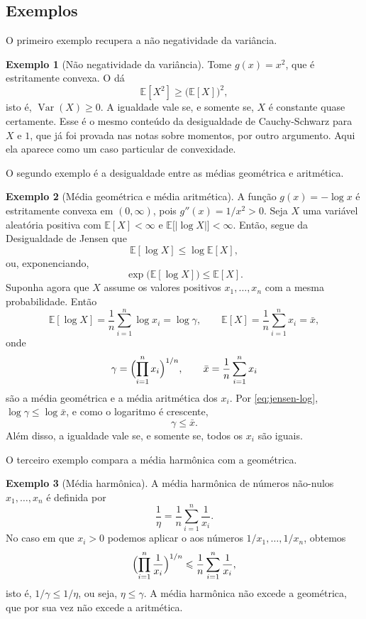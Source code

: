 \documentclass[12pt,portuguese]{article}
\theoremstyle{definition}
\newtheorem{example}[example]{Exemplo}
\theoremstyle{plainexercise}
\theoremstyle{starredexercise}
\theoremstyle{definition}
\begin{document}
\subsection{Exemplos}\label{subsec:jensen-exemplos}

O primeiro exemplo recupera a não negatividade da variância.

\begin{example}[Não negatividade da variância]\label{ex:jensen-quadrado}
Tome $g(x)=x^2$, que é estritamente convexa. O  dá
\[
\mathbb{E}[X^2]\geqslant\bigl(\mathbb{E}[X]\bigr)^2,
\]
isto é, $\operatorname{Var}(X)\geqslant0$. A igualdade vale se, e somente se,
$X$ é constante quase certamente. Esse é o mesmo conteúdo da desigualdade de
Cauchy-Schwarz para $X$ e $1$, que já foi provada nas notas sobre momentos, por outro
argumento. Aqui ela aparece como um caso particular de convexidade.
\end{example}

O segundo exemplo é a desigualdade entre as médias geométrica e aritmética.

\begin{example}[Média geométrica e média aritmética]\label{ex:media-geometrica}
A função $g(x)=-\log x$ é estritamente convexa em $(0,\infty)$, pois
$g''(x)=1/x^2>0$. Seja $X$ uma variável aleatória positiva com
$\mathbb{E}[X]<\infty$ e $\mathbb{E}\bigl[|\log X|\bigr]<\infty$. 
Então, segue da Desigualdade de Jensen que
\begin{equation}\label{eq:jensen-log}
\mathbb{E}[\log X]\leqslant\log\mathbb{E}[X],
\end{equation}
ou, exponenciando,
\[
\exp\bigl(\mathbb{E}[\log X]\bigr)\leqslant\mathbb{E}[X].
\]
Suponha agora que $X$ assume os valores positivos $x_1,\ldots,x_n$ com a mesma
probabilidade. Então
\[
\mathbb{E}[\log X]=\frac{1}{n}\sum_{i=1}^{n}\log x_i=\log\gamma,
\qquad
\mathbb{E}[X]=\frac{1}{n}\sum_{i=1}^{n}x_i=\bar{x},
\]
onde
\[
\gamma=\Bigl(\prod_{i=1}^{n}x_i\Bigr)^{1/n},
\qquad
\bar{x}=\frac{1}{n}\sum_{i=1}^{n}x_i
\]
são a média geométrica e a média aritmética dos $x_i$. Por \eqref{eq:jensen-log},
$\log\gamma\leqslant\log\bar{x}$, e como o logaritmo é crescente,
\[
\gamma\leqslant\bar{x}.
\]
Além disso, a igualdade vale se, e somente se, todos os $x_i$ são iguais.
\end{example}

O terceiro exemplo compara a média harmônica com a geométrica.

\begin{example}[Média harmônica]\label{ex:media-harmonica}
A média harmônica de números não-nulos $x_1,\ldots,x_n$ é definida por
\[
\frac{1}{\eta}=\frac{1}{n}\sum_{i=1}^{n}\frac{1}{x_i}.
\]
No caso em que $x_i>0$ podemos aplicar o  aos números $1/x_1,\ldots,1/x_n$,
obtemos
\[
\Bigl(\prod_{i=1}^{n}\frac{1}{x_i}\Bigr)^{1/n}
\leqslant
\frac{1}{n}\sum_{i=1}^{n}\frac{1}{x_i},
\]
isto é, $1/\gamma\leqslant1/\eta$, ou seja, $\eta\leqslant\gamma$. A média
harmônica não excede a geométrica, que por sua vez não excede a aritmética.
\end{example}
\end{document}
